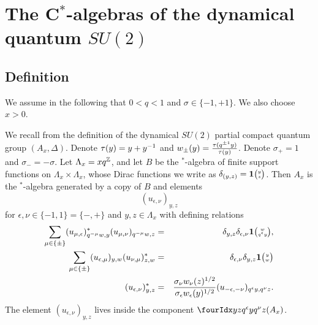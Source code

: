 


\section{The C$^*$-algebras of the dynamical quantum $SU(2)$}\label{SecUni}

\subsection{Definition}

We assume in the following that $0<q<1$ and $\sigma \in \{-1,+1\}$. We also choose $x>0$.

We recall from \cite{DCT1} the definition of the dynamical $SU(2)$ partial compact quantum group $(A_x,\Delta)$. Denote $\operatorname{\tau}(y) = y+y^{-1}$ and $w_{\pm}(y) = \frac{\operatorname{\tau}(q^{\pm 1}y)}{\operatorname{\tau}(y)}$. Denote $\sigma_+ = 1$ and $\sigma_- = -\sigma$. Let $\Lambda_x = xq^{\mathbb{Z}}$, and let $B$ be the $^*$-algebra of finite support functions on $\Lambda_x\times \Lambda_x$, whose Dirac functions we write as $\delta_{(y,z)}=\mathbf{1}{\tiny {\begin{pmatrix} y\\z\end{pmatrix}}}$. Then $A_x$ is the $^*$-algebra generated by a copy of $B$ and elements \[(u_{\epsilon,\nu})_{y,z}\] for $\epsilon,\nu\in \{-1,1\}=\{-,+\}$ and $y,z\in \Lambda_x$ with defining relations \begin{eqnarray*} \sum_{\mu\in \{\pm\}} (u_{\mu,\epsilon})_{q^{-\mu}w,y}^* (u_{\mu,\nu})_{q^{-\mu}w,z}&=& \delta_{y,z} \delta_{\epsilon,\nu} \mathbf{1}{\tiny {\begin{pmatrix} w\\q^{\epsilon}y\end{pmatrix}}},\\ \sum_{\mu\in \{\pm\}} (u_{\epsilon,\mu})_{y,w} (u_{\nu,\mu})_{z,w}^* &=& \delta_{\epsilon,\nu}\delta_{y,z} \mathbf{1}{\tiny {\begin{pmatrix} y\\w\end{pmatrix}}} \\ (u_{\epsilon,\nu})_{y,z}^* &=& \frac{\sigma_{\nu}w_{\nu}(z)^{1/2}}{\sigma_{\epsilon}w_{\epsilon}(y)^{1/2}} (u_{-\epsilon,-\nu})_{q^{\epsilon}y,q^{\nu}z}.\end{eqnarray*} The element $(u_{\epsilon,\nu})_{y,z}$ lives inside the component $\Gr{(A_x)}{y}{q^{\epsilon}y}{z}{q^{\nu}z}$.

